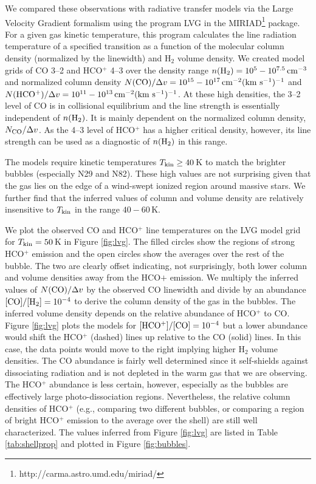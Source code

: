 We compared these observations with radiative transfer models via
the Large Velocity Gradient formalism using the program LVG in the
MIRIAD\footnote{http://carma.astro.umd.edu/miriad/} package.
For a given gas kinetic temperature,
this program calculates the line radiation temperature of a specified
transition as a function of the molecular column density (normalized by the
linewidth) and H$_2$ volume density.
We created model grids of CO 3--2 and HCO$^+$ 4--3
over the density range $n({\rm H_2})=10^5-10^{7.5}\,{\rm cm}^{-3}$
and normalized column density
$N({\rm CO})/\Delta v=10^{15}-10^{17}\,{\rm cm}^{-2}({\rm km~s^{-1}})^{-1}$
and
$N({\rm HCO^+})/\Delta v=10^{11}-10^{13}\,{\rm cm}^{-2}({\rm km~s^{-1}})^{-1}$.
At these high densities, the 3--2 level of CO is in collisional equilibrium
and the line strength is essentially independent of $n({\rm H_2})$.
It is mainly dependent on the normalized column density, $N_{\rm CO}/\Delta v$.
As the 4--3 level of HCO$^+$ has a higher critical density,
however, its line strength can be used as a diagnostic of $n({\rm H_2})$
in this range.

The models require kinetic temperatures $T_{\rm kin}\geq 40$\,K
to match the brighter bubbles (especially N29 and N82).
These high values are not surprising given that the gas lies
on the edge of a wind-swept ionized region around massive stars.
We further find that the inferred values of column and volume density
are relatively insensitive to $T_{\rm kin}$ in the range $40-60$\,K.

We plot the observed CO and HCO$^+$ line temperatures
on the LVG model grid for $T_{\rm kin}=50$\,K in Figure \ref{fig:lvg}.
The filled circles show the regions of strong HCO$^+$ emission
and the open circles show the averages over the rest of the bubble.
The two are clearly offset indicating, not surprisingly,
both lower column and volume densities away from the HCO$+$ emission.
We multiply the inferred values of $N({\rm CO})/\Delta v$
by the observed CO linewidth and divide by an abundance
${\rm [CO]/[H_2]}=10^{-4}$
to derive the column density of the gas in the bubbles.
The inferred volume density depends on the relative abundance
of HCO$^+$ to CO. Figure \ref{fig:lvg} plots the models for ${\rm [HCO^+]/[CO]}=10^{-4}$
but a lower abundance would shift the HCO$^+$ (dashed) lines up
relative to the CO (solid) lines. In this case, the data points would
move to the right implying higher H$_2$ volume densities.
The CO abundance is fairly well determined since it self-shields
against dissociating radiation and is not depleted in the warm
gas that we are observing. The HCO$^+$ abundance is less certain,
however, especially as the bubbles are effectively large
photo-dissociation regions.
Nevertheless, the relative column densities of HCO$^+$ (e.g.,
comparing two different bubbles, or comparing a region
of bright HCO$^+$ emission to the average over the shell) are still
well characterized. The values inferred from Figure \ref{fig:lvg} are listed
in Table \ref{tab:shellprop} and plotted in Figure \ref{fig:bubbles}.



